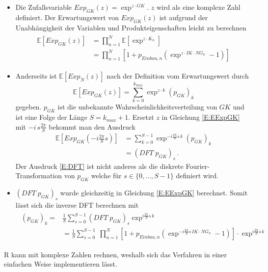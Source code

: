 \begin{itemize}
	\item Die Zufallsvariable $Exp_{GK}(z)=\exp^{z \cdot GK}$. $z$ wird als eine komplexe Zahl definiert. Der Erwartungswert von $Exp_{GK}(z)$ ist aufgrund der Unabhängigkeit der Variablen und Produkteigenschaften leicht zu berechnen
	\begin{align}
	\begin{split}\label{E:EExpGK}
		\mathbb{E}[Exp_{GK}(z)]&= \prod_{n=1}^{N}\mathbb{E}[\exp^{z\cdot K_n}]\\
		&= \prod_{n=1}^{N}\left[1+p_{Einbau,n}\left(\exp^{z\cdot IK\cdot NG_n}-1\right)\right]
		\end{split}
	\end{align}
	
	\item Anderseits ist $\mathbb{E}[Exp_N(z)]$  nach der Definition vom Erwartungswert durch 
	\begin{equation}\label{E:DEExpGK}
		\mathbb{E}[Exp_{GK}(z)]= \sum_{k=0}^{k_{max}} \exp^{z\cdot k} \left(p_{GK}\right)_k
	\end{equation}
	gegeben. $p_{GK}$  ist die unbekannte Wahrscheinlichkeitsverteilung von $GK$ und ist eine Folge der Länge $S=k_{max}+1$. Ersetzt $z$ in Gleichung \ref{E:EExpGK}  mit $-i\,s\frac{ 2\pi }{S}$  bekommt man den Ausdruck
	\begin{align}\label{E:DFT}
		\mathbb{E}\left[Exp_{GK}\left(-i\frac{ 2\pi }{S}s\right)\right]&= \sum_{k=0}^{S-1} \exp^{-i  \frac{ 2\pi }{S} s\,k} \left(p_{GK}\right)_k\\
		& = \left(DFT\; p_{GK}\right)_s \,.\nonumber
	\end{align}
	Der Ausdruck \ref{E:DFT} ist nicht anderes als die diskrete Fourier-Transformation von $p_{GK}$ welche für $s \in \{0,\dots,S-1\}$ definiert wird.

	\item $\left(DFT\; p_{GK}\right)_s$ wurde gleichzeitig in Gleichung \ref{E:EExpGK} berechnet. Somit lässt sich die inverse DFT berechnen mit
	\begin{align}
	\begin{split}
	\left(p_{GK}\right)_k = &\frac{1}{S} \sum_{s=0}^{S-1} \left(DFT\; p_{GK}\right)_s \exp^{i\frac{ 2\pi }{S}s\,k} \\
	&=\frac{1}{S} \sum_{s=0}^{S-1} \;\prod_{n=1}^{N}\left[1+p_{Einbau,n}\left(\exp^{-i\frac{ 2\pi }{S}s\, IK\cdot NG_n}-1\right)\right]\cdot \exp^{i\frac{ 2\pi }{S}s \,k}
	\end{split}
	\end{align}
\end{itemize}
R kann mit komplexe Zahlen rechnen, weshalb sich das Verfahren in einer einfachen Weise implementieren lässt.
